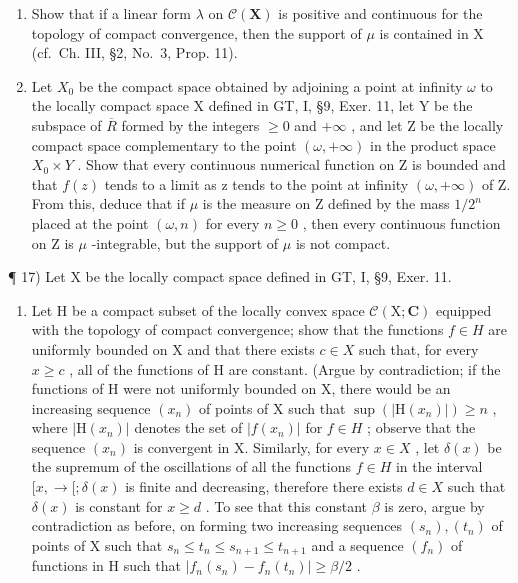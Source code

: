 \begin{enumerate}
\item
  Show that if a linear form \(\lambda\) on \(\mathcal{C}(\mathbf{X})\) is positive and continuous for the topology of compact convergence, then the support of \(\mu\) is contained in X (cf.~Ch. III, §2, No.~3, Prop. 11).
\item
  Let \(X_{0}\) be the compact space obtained by adjoining a point at infinity \(\omega\) to the locally compact space X defined in GT, I, §9, Exer. 11, let Y be the subspace of \(\overline{R}\) formed by the integers \(\geqslant 0\) and \(+\infty\) , and let Z be the locally compact space complementary to the point \((\omega, +\infty)\) in the product space \(X_{0} \times Y\) . Show that every continuous numerical function on Z is bounded and that \(f(z)\) tends to a limit as z tends to the point at infinity \((\omega, +\infty)\) of Z. From this, deduce that if \(\mu\) is the measure on Z defined by the mass \(1/2^{n}\) placed at the point \((\omega, n)\) for every \(n \geqslant 0\) , then every continuous function on Z is \(\mu\) -integrable, but the support of \(\mu\) is not compact.
\end{enumerate}

¶ 17) Let X be the locally compact space defined in GT, I, §9, Exer. 11.

\begin{enumerate}
\def\labelenumi{\alph{enumi})}
\tightlist
\item
  Let H be a compact subset of the locally convex space \(\mathcal{C}(\mathrm{X};\mathbf{C})\) equipped with the topology of compact convergence; show that the functions \(f \in H\) are uniformly bounded on X and that there exists \(c \in X\) such that, for every \(x \geqslant c\) , all of the functions of H are constant. (Argue by contradiction; if the functions of H were not uniformly bounded on X, there would be an increasing sequence \((x_{n})\) of points of X such that \(\sup(|\mathrm{H}(x_{n})|) \geqslant n\) , where \(|\mathrm{H}(x_{n})|\) denotes the set of \(|f(x_{n})|\) for \(f \in H\) ; observe that the sequence \((x_{n})\) is convergent in X. Similarly, for every \(x \in X\) , let \(\delta(x)\) be the supremum of the oscillations of all the functions \(f \in H\) in the interval \([x, \rightarrow[; \delta(x)\) is finite and decreasing, therefore there exists \(d \in X\) such that \(\delta(x)\) is constant for \(x \geqslant d\) . To see that this constant \(\beta\) is zero, argue by contradiction as before, on forming two increasing sequences \((s_{n}), (t_{n})\) of points of X such that \(s_{n} \leqslant t_{n} \leqslant s_{n+1} \leqslant t_{n+1}\) and a sequence \((f_{n})\) of functions in H such that \(|f_{n}(s_{n}) - f_{n}(t_{n})| \geqslant \beta/2\) .
\end{enumerate}

